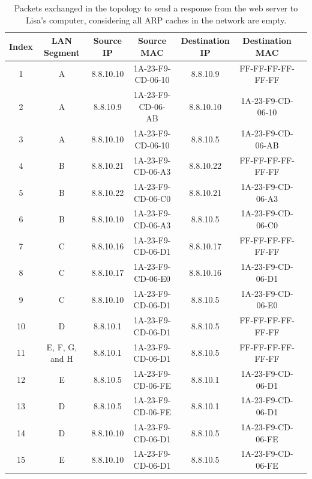 \begin{table}[H]
\label{tab:tab2}
\caption{Packets exchanged in the topology to send a response from the web server
    to Lisa's computer, considering all ARP caches in the network are empty.}
\begin{tabular}{|c|c|c|c|c|c|c|}
\hline
Index & LAN Segment    & Source IP & Source MAC        & Destination IP & Destination MAC   \\ \hline
1     & A              & 8.8.10.10 & 1A-23-F9-CD-06-10 & 8.8.10.9       & FF-FF-FF-FF-FF-FF \\ \hline
2     & A              & 8.8.10.9  & 1A-23-F9-CD-06-AB & 8.8.10.10      & 1A-23-F9-CD-06-10 \\ \hline
3     & A              & 8.8.10.10 & 1A-23-F9-CD-06-10 & 8.8.10.5       & 1A-23-F9-CD-06-AB \\ \hline
4     & B              & 8.8.10.21 & 1A-23-F9-CD-06-A3 & 8.8.10.22      & FF-FF-FF-FF-FF-FF \\ \hline
5     & B              & 8.8.10.22 & 1A-23-F9-CD-06-C0 & 8.8.10.21      & 1A-23-F9-CD-06-A3 \\ \hline
6     & B              & 8.8.10.10 & 1A-23-F9-CD-06-A3 & 8.8.10.5       & 1A-23-F9-CD-06-C0 \\ \hline
7     & C              & 8.8.10.16 & 1A-23-F9-CD-06-D1 & 8.8.10.17      & FF-FF-FF-FF-FF-FF \\ \hline
8     & C              & 8.8.10.17 & 1A-23-F9-CD-06-E0 & 8.8.10.16      & 1A-23-F9-CD-06-D1 \\ \hline
9     & C              & 8.8.10.10 & 1A-23-F9-CD-06-D1 & 8.8.10.5       & 1A-23-F9-CD-06-E0 \\ \hline
10    & D              & 8.8.10.1  & 1A-23-F9-CD-06-D1 & 8.8.10.5       & FF-FF-FF-FF-FF-FF \\ \hline
11    & E, F, G, and H & 8.8.10.1  & 1A-23-F9-CD-06-D1 & 8.8.10.5       & FF-FF-FF-FF-FF-FF \\ \hline
12    & E              & 8.8.10.5  & 1A-23-F9-CD-06-FE & 8.8.10.1       & 1A-23-F9-CD-06-D1 \\ \hline
13    & D              & 8.8.10.5  & 1A-23-F9-CD-06-FE & 8.8.10.1       & 1A-23-F9-CD-06-D1 \\ \hline
14    & D              & 8.8.10.10 & 1A-23-F9-CD-06-D1 & 8.8.10.5       & 1A-23-F9-CD-06-FE \\ \hline
15    & E              & 8.8.10.10 & 1A-23-F9-CD-06-D1 & 8.8.10.5       & 1A-23-F9-CD-06-FE \\ \hline
\end{tabular}
\end{table}
